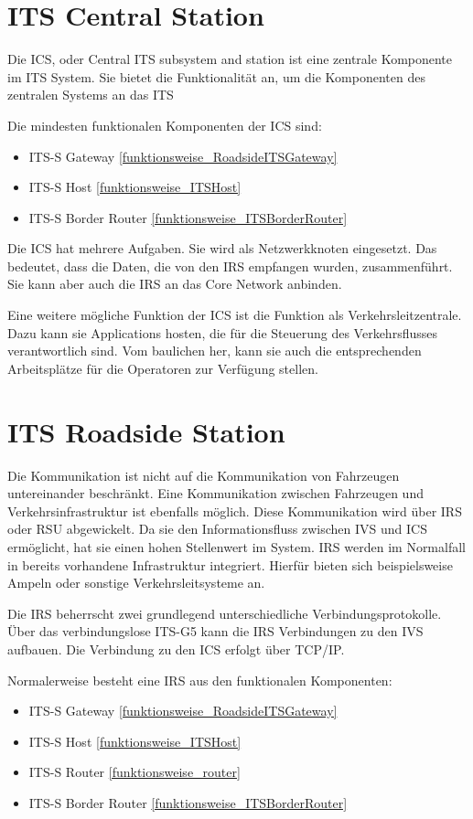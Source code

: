 \section{ITS Central Station}
Die \ac{ICS}, oder Central \ac{ITS} subsystem and station ist eine zentrale Komponente im \ac{ITS} System. Sie bietet die Funktionalität an, um die Komponenten des zentralen Systems an das \ac{ITS} 

Die mindesten funktionalen Komponenten der \ac{ICS} sind:
\begin{itemize}
	\item \ac{ITS-S} Gateway \ref{funktionsweise_RoadsideITSGateway}
	\item \ac{ITS-S} Host \ref{funktionsweise_ITSHost}
	\item \ac{ITS-S} Border Router \ref{funktionsweise_ITSBorderRouter}
\end{itemize}

Die \ac{ICS} hat mehrere Aufgaben. Sie wird als Netzwerkknoten eingesetzt. Das bedeutet, dass die Daten, die von den \ac{IRS} empfangen wurden, zusammenführt. Sie kann aber auch die \ac{IRS} an das Core Network anbinden.

Eine weitere mögliche Funktion der \ac{ICS} ist die Funktion als Verkehrsleitzentrale. Dazu kann sie Applications hosten, die für die Steuerung des Verkehrsflusses verantwortlich sind. Vom baulichen her, kann sie auch die entsprechenden Arbeitsplätze für die Operatoren zur Verfügung stellen. 
	
	
\section{ITS Roadside Station}
Die Kommunikation ist nicht auf die Kommunikation von Fahrzeugen untereinander beschränkt. Eine Kommunikation zwischen Fahrzeugen und Verkehrsinfrastruktur ist ebenfalls möglich. Diese Kommunikation wird über \ac{IRS} oder \ac{RSU} abgewickelt. Da sie den Informationsfluss zwischen \ac{IVS} und \ac{ICS} ermöglicht, hat sie einen hohen Stellenwert im System. \ac{IRS} werden im Normalfall in bereits vorhandene Infrastruktur integriert. Hierfür bieten sich beispielsweise Ampeln oder sonstige Verkehrsleitsysteme an. 

Die \ac{IRS} beherrscht zwei grundlegend unterschiedliche Verbindungsprotokolle. Über das verbindungslose ITS-G5 kann die \ac{IRS} Verbindungen zu den \ac{IVS} aufbauen. Die Verbindung zu den \ac{ICS} erfolgt über TCP/IP. 

Normalerweise besteht eine \ac{IRS} aus den funktionalen Komponenten: 
\begin{itemize}
	\item  \ac{ITS-S} Gateway \ref{funktionsweise_RoadsideITSGateway}
	\item \ac{ITS-S} Host \ref{funktionsweise_ITSHost}
	\item \ac{ITS-S} Router \ref{funktionsweise_router}
	\item \ac{ITS-S} Border Router \ref{funktionsweise_ITSBorderRouter}
\end{itemize}

